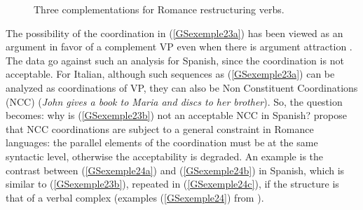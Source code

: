 \documentclass[output=paper
	        ,collection
	        ,collectionchapter
 	        ,biblatex
                ,babelshorthands
                ,newtxmath
                ,draftmode
                ,colorlinks, citecolor=brown
]{langscibook}
\begin{document}
{\begin{figure}
\begin{subfigure}{.5\textwidth}
\label{GSfigure3c}
\end{subfigure}
\caption{Three complementations for Romance restructuring verbs.}
\label{GSfigure3}
\end{figure}

The possibility of the coordination in (\ref{GSexemple23a}) has been viewed as an argument in favor of a complement VP even when there is argument attraction \citep{andrews1999complex}. The data go against such an analysis for Spanish, since the coordination is not acceptable. For Italian, although such sequences as (\ref{GSexemple23a}) can be analyzed as coordinations of VP, they can also be Non Constituent Coordinations (NCC) (\emph{John gives a book to Maria and discs to her brother}). So, the question becomes: why is (\ref{GSexemple23b}) not an acceptable NCC in Spanish? \cite{AG2010} propose that NCC coordinations are subject to a general constraint in Romance languages: the parallel elements of the coordination must be at the same syntactic level, otherwise the acceptability is degraded. An example is the contrast between (\ref{GSexemple24a}) and (\ref{GSexemple24b}) in Spanish, which is similar to (\ref{GSexemple23b}), repeated in (\ref{GSexemple24c}), if the structure is that of a verbal complex (examples (\ref{GSexemple24}) from \citealt[137, 144]{AG2010}).

\eal
	\label{GSexemple24} 
	\label{GSexemple24a}
	
	\label{GSexemple24b}
	
	\label{GSexemple24c}
\zl

}
\end{document}
